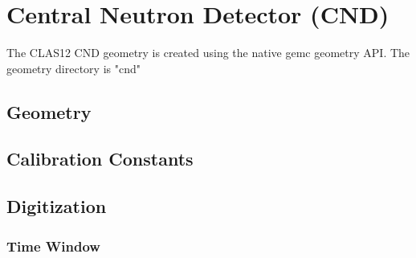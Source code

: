 \section{Central Neutron Detector (CND)}


The CLAS12 CND geometry is created using the native gemc geometry API.
The geometry directory is "cnd"

\subsection{Geometry}

\subsection{Calibration Constants}


\subsection{Digitization}

\subsubsection{Time Window}

